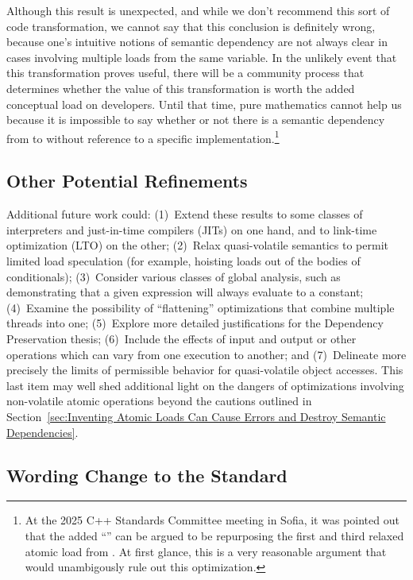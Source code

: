 Although this result is unexpected, and while we don't recommend this sort of
code transformation, we cannot say that this conclusion is definitely
wrong, because one's intuitive notions of semantic dependency are not
always clear in cases involving multiple loads from the same variable.
In the unlikely event that this transformation proves useful, there
will be a community process that determines whether the value of this
transformation is worth the added conceptual load on developers.
Until that time, pure mathematics cannot help us because it is
impossible to say whether or not there is a semantic dependency from
 to  without reference to a specific implementation.\footnote{
	At the 2025 C++ Standards Committee meeting in Sofia, it was
	pointed out that the added ``'' can be argued
	to be repurposing the first and third relaxed atomic load from
	.
	At first glance, this is a very reasonable argument that would
	unambigously rule out this optimization.}

\subsection{Other Potential Refinements}
\label{sec:Other Potential Refinements}

Additional future work could:
(1)~Extend these results to some classes of interpreters and just-in-time
compilers (JITs) on
one hand, and to link-time optimization (LTO) on the other;
(2)~Relax quasi-volatile semantics to permit limited load speculation
(for example, hoisting loads out of the bodies of conditionals);
(3)~Consider various classes of global analysis, such as
demonstrating that a given expression will always evaluate to a constant;
(4)~Examine the possibility of ``flattening'' optimizations that combine
multiple threads into one;
(5)~Explore more detailed justifications for the Dependency Preservation thesis;
(6)~Include the effects of input and output or other operations which
can vary from one execution to another; and
(7)~Delineate more precisely the limits of permissible behavior for
quasi-volatile object accesses.
This last item may well shed additional light on the dangers of
optimizations involving non-volatile atomic operations beyond the cautions
outlined in
Section~\ref{sec:Inventing Atomic Loads Can Cause Errors and
Destroy Semantic Dependencies}.

\subsection{Wording Change to the Standard}
\label{sec:Wording Change to the Standard}

